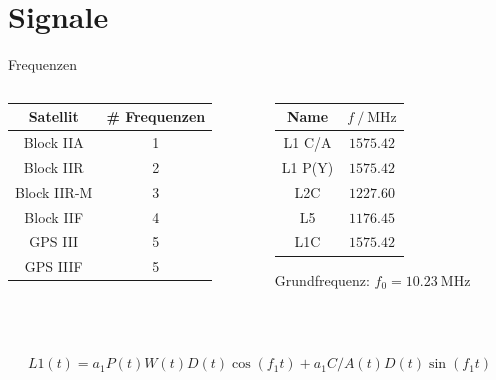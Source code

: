 \section{Signale}
\label{sec:signale}

\begin{frame}{Frequenzen}
    \begin{columns}
        \begin{column}{0.5\textwidth}
            \begin{table}
                \centering
                \begin{tabular}{c S[table-format=1.0]}
                    \toprule
                    {Satellit} & {\# Frequenzen} \\
                    \midrule
                    Block IIA   & 1 \\
                    Block IIR   & 2 \\
                    Block IIR-M & 3 \\
                    Block IIF   & 4 \\
                    GPS III     & 5 \\
                    GPS IIIF    & 5 \\
                    \bottomrule
                \end{tabular}
            \end{table}
        \end{column}
        \begin{column}{0.5\textwidth}
            \begin{table}
                \centering
                \begin{tabular}{c c}
                    \toprule
                    {Name} & {$f\:/\:\si{\mega\hertz}$} \\
                    \midrule
                    L1 C/A  & $\num{1575.42}$ \\
                    L1 P(Y) & $\num{1575.42}$ \\
                    L2C     & $\num{1227.60}$ \\
                    L5      & $\num{1176.45}$ \\
                    L1C     & $\num{1575.42}$ \\
                    \bottomrule
                \end{tabular}
            \end{table}
            Grundfrequenz: $f_0 = \SI{10.23}{\mega\hertz}$
        \end{column}
    \end{columns}
    ~\\~\\
    \begin{equation}
        L1(t) = a_1P(t)W(t)D(t)\cos(f_1t)+a_1C/A(t)D(t)\sin(f_1t)
    \end{equation}
\end{frame}

